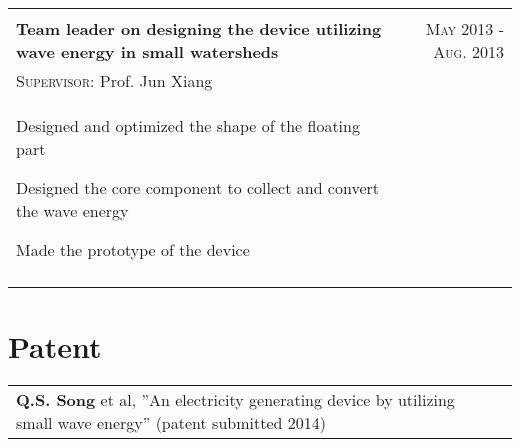 \documentclass[a4paper,10pt]{article}
\begin{document}
\begin{tabular}{p{14cm}r}
\multicolumn{2}{c}{} \\
 \textbf{Team leader on designing the device utilizing wave energy in small watersheds}  &\textsc{May 2013 - Aug. 2013} \\
\hspace{1em}  \textsc{Supervisor:} Prof. Jun Xiang  & \vspace{-0.5em}\\
\begin{compactitem}
       \item Designed and optimized the shape of the floating part\vspace{0.2em}
       \item Designed the core component to collect and convert the wave energy\vspace{0.2em}
       \item Made the prototype of the device
     \end{compactitem}&\vspace{-1em} \\
\multicolumn{2}{c}{} \vspace{-1.0em} \\


\end{tabular}

\section{Patent}
\begin{tabular}{ll}
\textbf{Q.S. Song} et al, ”An electricity generating device by utilizing small wave energy” (patent submitted 2014) &\\
\end{tabular}
\end{document}
